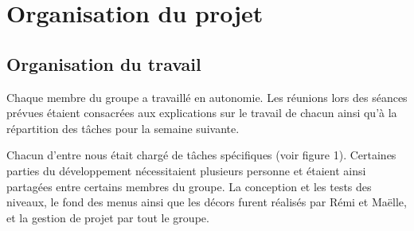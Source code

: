 \documentclass[12pt]{report}
\begin{document}
	\chapter{Organisation du projet}
		\section{Organisation du travail}
			Chaque membre du groupe a travaillé en autonomie. Les réunions lors des séances prévues étaient consacrées aux explications sur le travail de chacun ainsi qu'à la répartition des tâches pour la semaine suivante. 
			
			
			Chacun d'entre nous était chargé de tâches spécifiques (voir figure 1). Certaines parties du développement nécessitaient plusieurs personne et étaient ainsi partagées entre certains membres du groupe. La conception et les tests des niveaux, le fond des menus ainsi que les décors furent réalisés par Rémi et Maëlle, et la gestion de projet par tout le groupe. 
			
\end{document}
